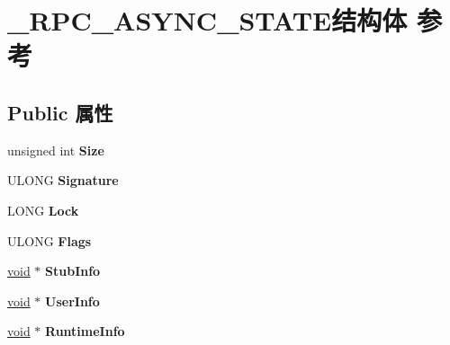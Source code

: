 \hypertarget{struct___r_p_c___a_s_y_n_c___s_t_a_t_e}{}\section{\+\_\+\+R\+P\+C\+\_\+\+A\+S\+Y\+N\+C\+\_\+\+S\+T\+A\+T\+E结构体 参考}
\label{struct___r_p_c___a_s_y_n_c___s_t_a_t_e}
\subsection*{Public 属性}
\begin{DoxyCompactItemize}
\item 
\mbox{\label{struct___r_p_c___a_s_y_n_c___s_t_a_t_e_ab70e96e35ebb4567f0e8ad2ae09b0a2f}} 
unsigned int {\bfseries Size}
\item 
\mbox{\label{struct___r_p_c___a_s_y_n_c___s_t_a_t_e_ab7261763461afb2e1a16fd76580dc578}} 
U\+L\+O\+NG {\bfseries Signature}
\item 
\mbox{\label{struct___r_p_c___a_s_y_n_c___s_t_a_t_e_ab2d1c45fc4c77f76a6e2d5c2f5128f00}} 
L\+O\+NG {\bfseries Lock}
\item 
\mbox{\label{struct___r_p_c___a_s_y_n_c___s_t_a_t_e_a8e38567932f443aad18a4cba3c2e64e9}} 
U\+L\+O\+NG {\bfseries Flags}
\item 
\mbox{\label{struct___r_p_c___a_s_y_n_c___s_t_a_t_e_a164b768f73a8fc3f6344dccec77ae598}} 
\hyperlink{interfacevoid}{void} $\ast$ {\bfseries Stub\+Info}
\item 
\mbox{\label{struct___r_p_c___a_s_y_n_c___s_t_a_t_e_a4e169f63f6f196ac749f536326311c70}} 
\hyperlink{interfacevoid}{void} $\ast$ {\bfseries User\+Info}
\item 
\mbox{\label{struct___r_p_c___a_s_y_n_c___s_t_a_t_e_af88e998f80b464440d2f899b07587ea7}} 
\hyperlink{interfacevoid}{void} $\ast$ {\bfseries Runtime\+Info}
\item 

\end{DoxyCompactItemize}
